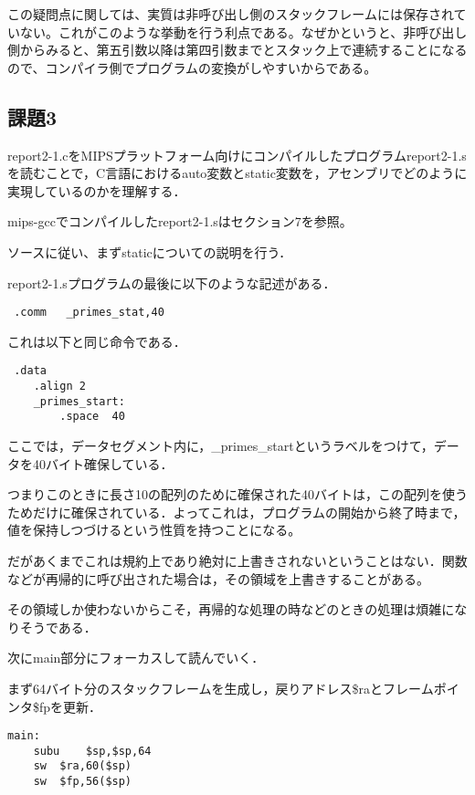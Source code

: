 \documentclass[a4j]{jarticle}
\begin{document}
この疑問点に関しては、実質は非呼び出し側のスタックフレームには保存されていない。これがこのような挙動を行う利点である。なぜかというと、非呼び出し側からみると、第五引数以降は第四引数までとスタック上で連続することになるので、コンパイラ側でプログラムの変換がしやすいからである。




\subsection{課題3}

report2-1.cをMIPSプラットフォーム向けにコンパイルしたプログラムreport2-1.sを読むことで，C言語におけるauto変数とstatic変数を，アセンブリでどのように実現しているのかを理解する．

mips-gccでコンパイルしたreport2-1.sはセクション7を参照。


ソースに従い、まずstaticについての説明を行う．

report2-1.sプログラムの最後に以下のような記述がある．

\begin{verbatim}
 .comm   _primes_stat,40
\end{verbatim}

これは以下と同じ命令である．

\begin{verbatim}
 .data
    .align 2
    _primes_start:
        .space  40
\end{verbatim}

ここでは，データセグメント内に，\_primes\_startというラベルをつけて，データを40バイト確保している．

つまりこのときに長さ10の配列のために確保された40バイトは，この配列を使うためだけに確保されている．よってこれは，プログラムの開始から終了時まで，値を保持しつづけるという性質を持つことになる。

だがあくまでこれは規約上であり絶対に上書きされないということはない．関数などが再帰的に呼び出された場合は，その領域を上書きすることがある。

その領域しか使わないからこそ，再帰的な処理の時などのときの処理は煩雑になりそうである．


次にmain部分にフォーカスして読んでいく．

まず64バイト分のスタックフレームを生成し，戻りアドレス\$raとフレームポインタ\$fpを更新．

\begin{verbatim}
main:
    subu    $sp,$sp,64
    sw  $ra,60($sp)
    sw  $fp,56($sp)
\end{verbatim}
\end{document}
